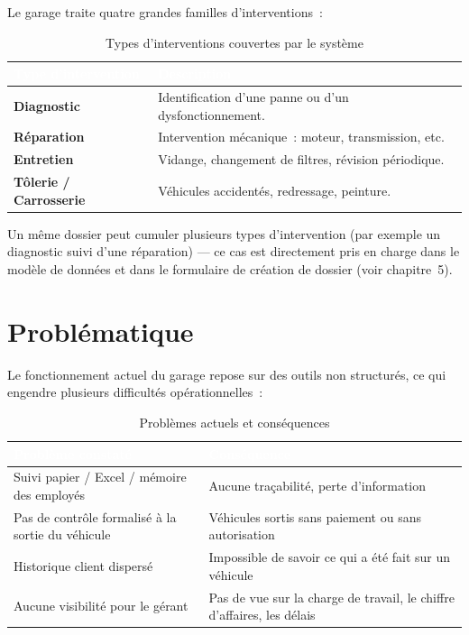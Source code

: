 \documentclass[11pt,a4paper]{report}
\begin{document}
Le garage traite quatre grandes familles d'interventions~:

\begin{table}[h!]
\centering
{}
\begin{tabularx}{\linewidth}{@{}l>{\raggedright\arraybackslash}X@{}}
\toprule
\rowcolor{km0blue}
\textcolor{white}{\textbf{Type d'intervention}} & \textcolor{white}{\textbf{Description}} \\
\midrule
\textbf{Diagnostic} & Identification d'une panne ou d'un dysfonctionnement. \\
\textbf{Réparation} & Intervention mécanique~: moteur, transmission, etc. \\
\textbf{Entretien} & Vidange, changement de filtres, révision périodique. \\
\textbf{Tôlerie / Carrosserie} & Véhicules accidentés, redressage, peinture. \\
\bottomrule
\end{tabularx}
\caption{Types d'interventions couvertes par le système}
\end{table}

Un même dossier peut cumuler plusieurs types d'intervention (par exemple un diagnostic
suivi d'une réparation) --- ce cas est directement pris en charge dans le modèle de
données et dans le formulaire de création de dossier (voir chapitre~5).

\section{Problématique}

Le fonctionnement actuel du garage repose sur des outils non structurés, ce qui engendre
plusieurs difficultés opérationnelles~:

\begin{table}[h!]
\centering
{}
\begin{tabularx}{\linewidth}{@{}>{\raggedright\arraybackslash}X>{\raggedright\arraybackslash}X@{}}
\toprule
\rowcolor{km0blue}
\textcolor{white}{\textbf{Problème constaté}} & \textcolor{white}{\textbf{Conséquence}} \\
\midrule
Suivi papier / Excel / mémoire des employés & Aucune traçabilité, perte d'information \\
Pas de contrôle formalisé à la sortie du véhicule & Véhicules sortis sans paiement ou sans autorisation \\
Historique client dispersé & Impossible de savoir ce qui a été fait sur un véhicule \\
Aucune visibilité pour le gérant & Pas de vue sur la charge de travail, le chiffre d'affaires, les délais \\
\bottomrule
\end{tabularx}
\caption{Problèmes actuels et conséquences}
\end{table}
\end{document}
